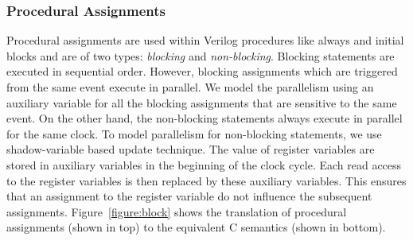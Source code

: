\subsubsection{Procedural Assignments}
%
Procedural assignments are used within Verilog 
procedures like always and initial blocks and are of 
two types: \emph{blocking} and \emph{non-blocking}.  
Blocking statements are executed in sequential order. However, blocking
assignments which are triggered from the same event execute
in parallel.  We model the parallelism using an auxiliary variable
for all the blocking assignments that are sensitive to the same event. 
On the other hand, the non-blocking statements always 
execute in parallel for the same clock. To model 
parallelism for non-blocking statements, we 
use shadow-variable based update technique. 
The value of register variables are stored in 
auxiliary variables in the beginning of the clock cycle.  
Each read access to the register variables is then replaced 
by these auxiliary variables. This ensures that 
an assignment to the register variable do not influence the 
subsequent assignments. Figure~\ref{figure:block} shows 
the translation of procedural assignments (shown in top) to 
the equivalent C semantics (shown in bottom).     

